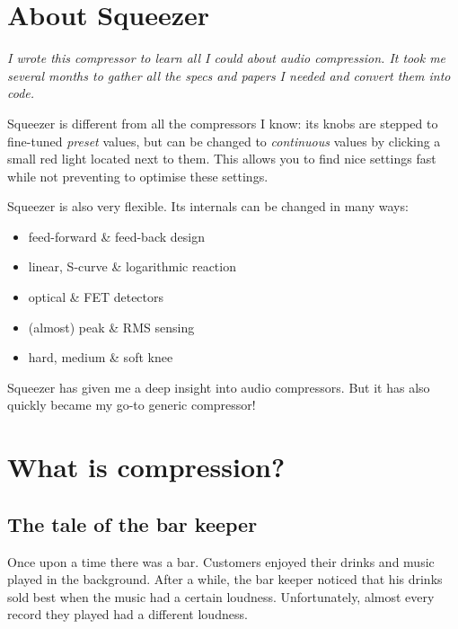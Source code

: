 \maketitle

\tableofcontents

\clearpage  %

\chapter{About Squeezer}
\label{chap:about_squeezer}

\emph{I wrote this compressor to learn all I could about audio
  compression.  It took me several months to gather all the specs and
  papers I needed and convert them into code.}

Squeezer is different from all the compressors I know: its knobs are
stepped to fine-tuned \emph{preset} values, but can be changed to
\emph{continuous} values by clicking a small red light located next to
them.  This allows you to find nice settings fast while not preventing
to optimise these settings.

Squeezer is also very flexible.  Its internals can be changed in many
ways:

\begin{itemize}
\item feed-forward \& feed-back design
\item linear, S-curve \& logarithmic reaction
\item optical \& FET detectors
\item (almost) peak \& RMS sensing
\item hard, medium \& soft knee
\end{itemize}

Squeezer has given me a deep insight into audio compressors.  But it
has also quickly became my go-to generic compressor!

\chapter{What is compression?}
\label{chap:what_is_compression}

\section{The tale of the bar keeper}
\label{sec:compression_tale_of_bar_keeper}

Once upon a time there was a bar.  Customers enjoyed their drinks and
music played in the background.  After a while, the bar keeper noticed
that his drinks sold best when the music had a certain loudness.
Unfortunately, almost every record they played had a different
loudness.

